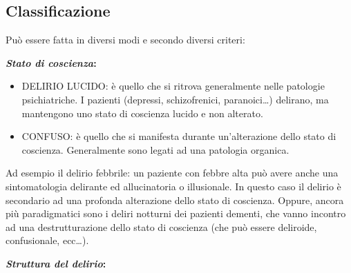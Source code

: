 \subsection{Classificazione}
Può essere fatta in diversi modi e secondo diversi criteri:

\textbf{\emph{Stato di coscienza}: }

\begin{itemize}
\item
  DELIRIO LUCIDO: è quello che si ritrova generalmente nelle patologie
  psichiatriche. I pazienti (depressi, schizofrenici, paranoici\ldots{})
  delirano, ma mantengono uno stato di coscienza lucido e non alterato.
\item
  CONFUSO: è quello che si manifesta durante un'alterazione dello stato
  di coscienza. Generalmente sono legati ad una patologia organica.
\end{itemize}

Ad esempio il delirio febbrile: un paziente con febbre alta può avere
anche una sintomatologia delirante ed allucinatoria o illusionale. In
questo caso il delirio è secondario ad una profonda alterazione dello
stato di coscienza. Oppure, ancora più paradigmatici sono i deliri
notturni dei pazienti dementi, che vanno incontro ad una
destrutturazione dello stato di coscienza (che può essere deliroide,
confusionale, ecc\ldots{}).

\textbf{\emph{Struttura del delirio}: }


